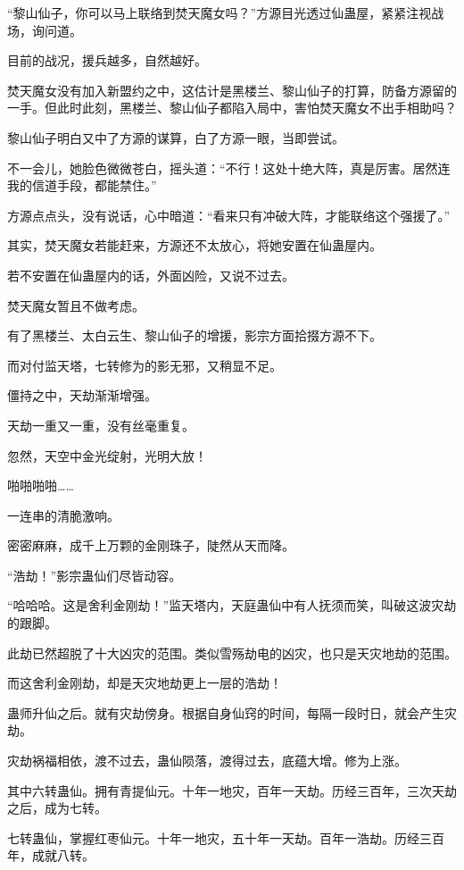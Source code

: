 
\begin{this_body}

“黎山仙子，你可以马上联络到焚天魔女吗？”方源目光透过仙蛊屋，紧紧注视战场，询问道。

目前的战况，援兵越多，自然越好。

焚天魔女没有加入新盟约之中，这估计是黑楼兰、黎山仙子的打算，防备方源留的一手。但此时此刻，黑楼兰、黎山仙子都陷入局中，害怕焚天魔女不出手相助吗？

黎山仙子明白又中了方源的谋算，白了方源一眼，当即尝试。

不一会儿，她脸色微微苍白，摇头道：“不行！这处十绝大阵，真是厉害。居然连我的信道手段，都能禁住。”

方源点点头，没有说话，心中暗道：“看来只有冲破大阵，才能联络这个强援了。”

其实，焚天魔女若能赶来，方源还不太放心，将她安置在仙蛊屋内。

若不安置在仙蛊屋内的话，外面凶险，又说不过去。

焚天魔女暂且不做考虑。

有了黑楼兰、太白云生、黎山仙子的增援，影宗方面拾掇方源不下。

而对付监天塔，七转修为的影无邪，又稍显不足。

僵持之中，天劫渐渐增强。

天劫一重又一重，没有丝毫重复。

忽然，天空中金光绽射，光明大放！

啪啪啪啪……

一连串的清脆激响。

密密麻麻，成千上万颗的金刚珠子，陡然从天而降。

“浩劫！”影宗蛊仙们尽皆动容。

“哈哈哈。这是舍利金刚劫！”监天塔内，天庭蛊仙中有人抚须而笑，叫破这波灾劫的跟脚。

此劫已然超脱了十大凶灾的范围。类似雪殇劫电的凶灾，也只是天灾地劫的范围。

而这舍利金刚劫，却是天灾地劫更上一层的浩劫！

蛊师升仙之后。就有灾劫傍身。根据自身仙窍的时间，每隔一段时日，就会产生灾劫。

灾劫祸福相依，渡不过去，蛊仙陨落，渡得过去，底蕴大增。修为上涨。

其中六转蛊仙。拥有青提仙元。十年一地灾，百年一天劫。历经三百年，三次天劫之后，成为七转。

七转蛊仙，掌握红枣仙元。十年一地灾，五十年一天劫。百年一浩劫。历经三百年，成就八转。


\end{this_body}
